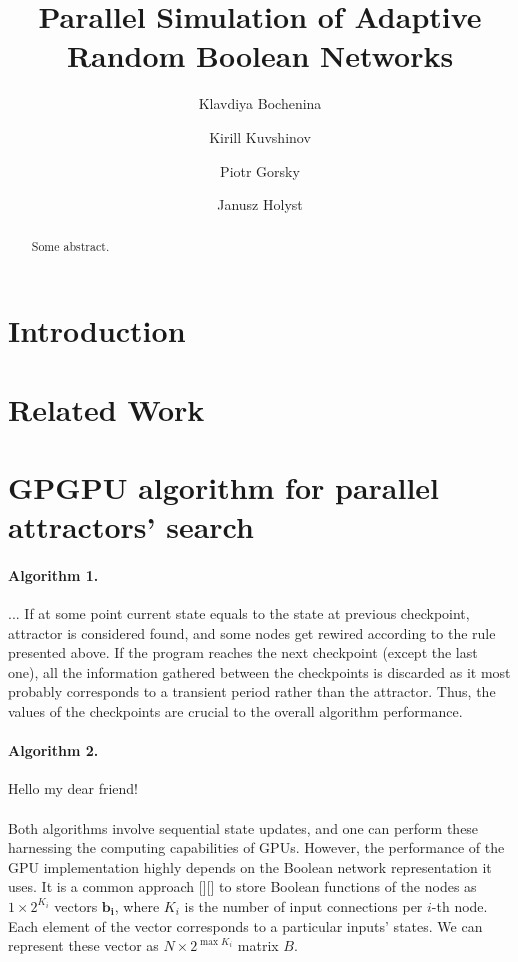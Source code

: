 \documentclass[procedia]{easychair}
\title{Parallel Simulation of Adaptive Random Boolean Networks}
\author{
	Klavdiya Bochenina\inst{1}
	\and
	Kirill Kuvshinov\inst{1}
	\and
	Piotr Gorsky\inst{2}
	\and
	Janusz Holyst\inst{1}\inst{2}
}
\institute{
	ITMO University, St. Petersburg, Russian Federation
	\and
	Warsaw University of Technology, Warsaw, Poland
}
\begin{document}
	
	\maketitle
	
	
	\begin{abstract}
		Some abstract.
	\end{abstract}
	
	
	\section{Introduction}
	\label{sect:introduction}


	\section{Related Work}
	\label{sect:related-work}

	\section{GPGPU algorithm for parallel attractors’ search}
	\label{sect:algorithm}
	\paragraph{Algorithm 1.} ... If at some point current state equals to the state at previous checkpoint, attractor is considered found, and some nodes get rewired according to the rule presented above. If the program reaches the next checkpoint (except the last one), all the information gathered between the checkpoints is discarded as it most probably corresponds to a transient period rather than the attractor. Thus, the values of the checkpoints are crucial to the overall algorithm performance.
	\paragraph{Algorithm 2.} Hello my dear friend!

	\paragraph{} Both algorithms involve sequential state updates, and one can perform these harnessing the computing capabilities of GPUs. However, the performance of the GPU implementation highly depends on the Boolean network representation it uses. It is a common approach [][] to store Boolean functions of the nodes as \(1 \times 2^{K_i}\) vectors \(\mathbf{b_i}\), where \(K_i\) is the number of input connections per \(i\)-th node. Each element of the vector corresponds to a particular inputs' states. We can represent these vector as \(N \times 2^{\max{K_i}}\) matrix \(B\).
	
\end{document}

